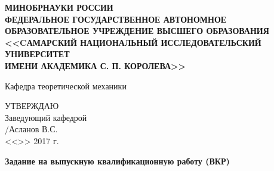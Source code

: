 \begin{figure}[H]
\end{figure}
\begin{center}
\tiny{\textbf{МИНОБРНАУКИ РОССИИ\\
ФЕДЕРАЛЬНОЕ ГОСУДАРСТВЕННОЕ АВТОНОМНОЕ\\
ОБРАЗОВАТЕЛЬНОЕ УЧРЕЖДЕНИЕ ВЫСШЕГО ОБРАЗОВАНИЯ\\
<<CАМАРСКИЙ НАЦИОНАЛЬНЫЙ ИССЛЕДОВАТЕЛЬСКИЙ УНИВЕРСИТЕТ\\
ИМЕНИ АКАДЕМИКА С. П. КОРОЛЕВА>>\\}}
\end{center}
\begin{center}
  {Кафедра теоретической механики}
\end{center}
 \vspace{1.5em}
\begin{minipage}{0.5\linewidth}
  \begin{flushleft}
    \end{flushleft}
  \end{minipage}
  \begin{minipage}{0.5\linewidth}
  \begin{flushright}
  УТВЕРЖДАЮ\\
  Заведующий кафедрой\\
  \underline{\hspace{7em}}/Асланов В.С.\\
  <<\underline{\hspace{2em}}>> \underline{\hspace{7em}} 2017 г.\\
  \end{flushright}
 \end{minipage}
  \vspace{0.5em}
  
  \begin{center}
  	\textbf{Задание на выпускную квалификационную работу (ВКР)}
  \end{center}
  
